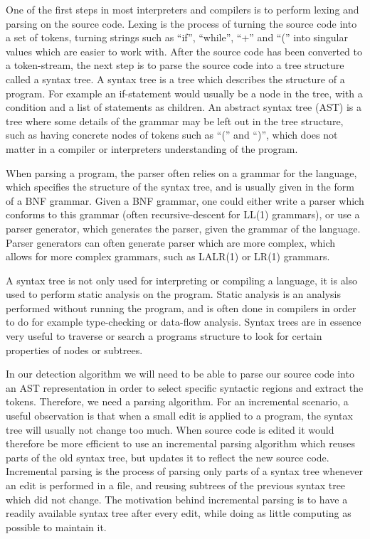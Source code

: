 One of the first steps in most interpreters and compilers is to perform lexing and parsing
on the source code. Lexing is the process of turning the source code into a set of tokens,
turning strings such as ``if'', ``while'', ``+'' and ``('' into singular values which are
easier to work with. After the source code has been converted to a token-stream, the next
step is to parse the source code into a tree structure called a syntax tree. A syntax tree
is a tree which describes the structure of a program. For example an if-statement would
usually be a node in the tree, with a condition and a list of statements as children. An
abstract syntax tree (AST) is a tree where some details of the grammar may be left out in
the tree structure, such as having concrete nodes of tokens such as ``('' and ``)'', which
does not matter in a compiler or interpreters understanding of the program.

When parsing a program, the parser often relies on a grammar for the language, which
specifies the structure of the syntax tree, and is usually given in the form of a BNF
grammar. Given a BNF grammar, one could either write a parser which conforms to this
grammar (often recursive-descent for LL(1) grammars), or use a parser generator, which
generates the parser, given the grammar of the language. Parser generators can often
generate parser which are more complex, which allows for more complex grammars, such as
LALR(1) or LR(1) grammars.

A syntax tree is not only used for interpreting or compiling a language, it is also used
to perform static analysis on the program. Static analysis is an analysis performed
without running the program, and is often done in compilers in order to do for example
type-checking or data-flow analysis. Syntax trees are in essence very useful to traverse
or search a programs structure to look for certain properties of nodes or subtrees. 

In our detection algorithm we will need to be able to parse our source code into an AST
representation in order to select specific syntactic regions and extract the tokens.
Therefore, we need a parsing algorithm. For an incremental scenario, a useful observation
is that when a small edit is applied to a program, the syntax tree will usually not change
too much. When source code is edited it would therefore be more efficient to use an
incremental parsing algorithm which reuses parts of the old syntax tree, but updates it to
reflect the new source code. Incremental parsing is the process of parsing only parts of a
syntax tree whenever an edit is performed in a file, and reusing subtrees of the previous
syntax tree which did not change. The motivation behind incremental parsing is to have a
readily available syntax tree after every edit, while doing as little computing as
possible to maintain it.

